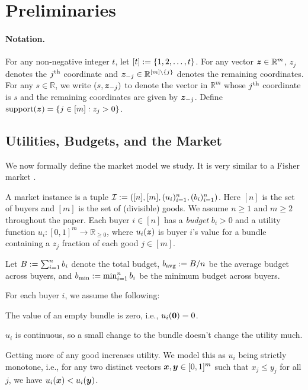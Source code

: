 \section{Preliminaries}
\label{sec:prelims}

\paragraph{Notation.}
For any non-negative integer $t$, let $[t] := \{1, 2, \ldots, t\}$.
%
For any vector $\bm{z} \in \mathbb{R}^m$, $z_j$ denotes the $j^{\textrm{th}}$ coordinate
and $\bm{z}_{-j} \in \mathbb{R}^{[m] \setminus \{j\}}$ denotes the remaining coordinates.
For any $s \in \mathbb{R}$, we write $(s, \bm{z}_{-j})$ to denote the vector in $\mathbb{R}^m$
whose $j^{\textrm{th}}$ coordinate is $s$ and the remaining coordinates are given by $\bm{z}_{-j}$.
Define $\operatorname{support}(\bm{z}) = \{j \in [m]: z_j > 0\}$.

\subsection{Utilities, Budgets, and the Market}

We now formally define the market model we study.
It is very similar to a Fisher market \cite{vazirani2007combinatorial}.

A market instance is a tuple
$\mathcal{I} := ([n], [m], (u_i)_{i=1}^n, (b_i)_{i=1}^n)$.
Here $[n]$ is the set of buyers and $[m]$ is the set of (divisible) goods. We assume $n \ge 1$ and $m \ge 2$ throughout the paper. Each buyer $i \in [n]$ has a \emph{budget} $b_i > 0$
and a utility function $u_i: [0, 1]^m \to \mathbb{R}_{\ge 0}$,
where $u_i(\bm{z})$ is buyer $i$'s value for a bundle containing
a $z_j$ fraction of each good $j \in [m]$.

Let $B := \sum_{i=1}^n b_i$ denote the total budget,
$b_{\operatorname{avg}} := B/n$ be the average budget across buyers,
and $b_{\min} := \min_{i=1}^n b_i$ be the minimum budget across buyers.

For each buyer $i$, we assume the following:
\begin{tightenum}
\item The value of an empty bundle is zero, i.e., $u_i(\mathbf{0}) = 0$.
\item $u_i$ is continuous, so a small change to the bundle doesn't change the utility much.
\item Getting more of any good increases utility. We model this as $u_i$ being strictly monotone,
    i.e., for any two distinct vectors $\bm{x}, \bm{y} \in [0, 1]^m$
    such that $x_j \le y_j$ for all $j$, we have $u_i(\bm{x}) < u_i(\bm{y})$.
\end{tightenum}

